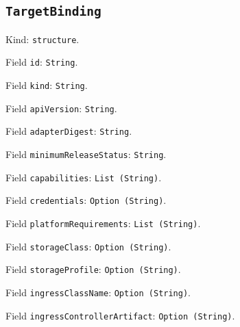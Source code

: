 \documentclass[11pt]{article}
\begin{document}
\subsection*{\texttt{TargetBinding}}
\noindent Kind: \texttt{structure}.\par
\noindent Field \texttt{id}: \texttt{String}.\par
\noindent Field \texttt{kind}: \texttt{String}.\par
\noindent Field \texttt{apiVersion}: \texttt{String}.\par
\noindent Field \texttt{adapterDigest}: \texttt{String}.\par
\noindent Field \texttt{minimumReleaseStatus}: \texttt{String}.\par
\noindent Field \texttt{capabilities}: \texttt{List (String)}.\par
\noindent Field \texttt{credentials}: \texttt{Option (String)}.\par
\noindent Field \texttt{platformRequirements}: \texttt{List (String)}.\par
\noindent Field \texttt{storageClass}: \texttt{Option (String)}.\par
\noindent Field \texttt{storageProfile}: \texttt{Option (String)}.\par
\noindent Field \texttt{ingressClassName}: \texttt{Option (String)}.\par
\noindent Field \texttt{ingressControllerArtifact}: \texttt{Option (String)}.\par
\end{document}
